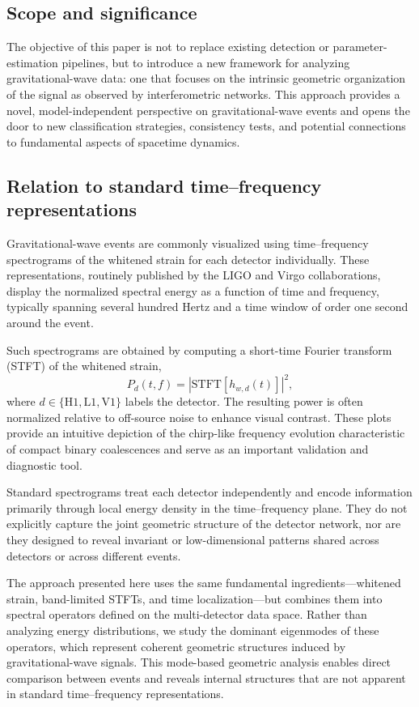 \documentclass[11pt,a4paper]{article}
\begin{document}
\subsection{Scope and significance}

The objective of this paper is not to replace existing detection or parameter-estimation pipelines, but to introduce a new framework for analyzing gravitational-wave data: one that focuses on the intrinsic geometric organization of the signal as observed by interferometric networks. This approach provides a novel, model-independent perspective on gravitational-wave events and opens the door to new classification strategies, consistency tests, and potential connections to fundamental aspects of spacetime dynamics.

\subsection{Relation to standard time--frequency representations}

Gravitational-wave events are commonly visualized using time--frequency spectrograms of the whitened strain for each detector individually. These representations, routinely published by the LIGO and Virgo collaborations, display the normalized spectral energy as a function of time and frequency, typically spanning several hundred Hertz and a time window of order one second around the event.

Such spectrograms are obtained by computing a short-time Fourier transform (STFT) of the whitened strain,
\begin{equation}
P_d(t,f) = |\mathrm{STFT}[h_{w,d}(t)]|^2,
\end{equation}
where $d \in \{\mathrm{H1}, \mathrm{L1}, \mathrm{V1}\}$ labels the detector. The resulting power is often normalized relative to off-source noise to enhance visual contrast. These plots provide an intuitive depiction of the chirp-like frequency evolution characteristic of compact binary coalescences and serve as an important validation and diagnostic tool.

Standard spectrograms treat each detector independently and encode information primarily through local energy density in the time--frequency plane. They do not explicitly capture the joint geometric structure of the detector network, nor are they designed to reveal invariant or low-dimensional patterns shared across detectors or across different events.

The approach presented here uses the same fundamental ingredients—whitened strain, band-limited STFTs, and time localization—but combines them into spectral operators defined on the multi-detector data space. Rather than analyzing energy distributions, we study the dominant eigenmodes of these operators, which represent coherent geometric structures induced by gravitational-wave signals. This mode-based geometric analysis enables direct comparison between events and reveals internal structures that are not apparent in standard time--frequency representations.
\end{document}
